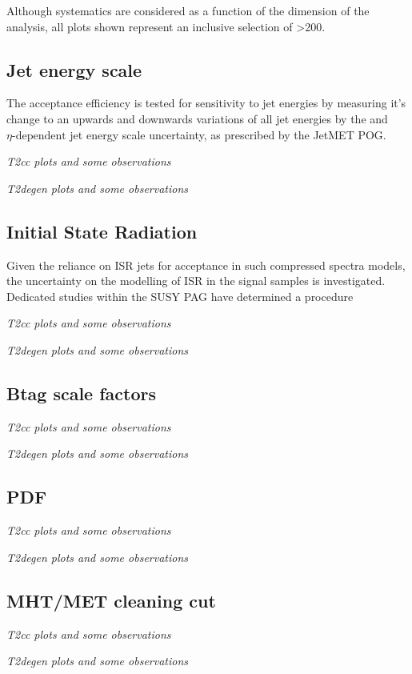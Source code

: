 Although systematics are considered as a function of the \HT dimension of the 
analysis, all plots shown represent an inclusive selection of \HT>200\gev.

\subsection{Jet energy scale}
The acceptance efficiency is tested for sensitivity to jet energies by measuring
it's change to an upwards and downwards variations of all jet energies by the 
\Pt and $\eta\text{-dependent}$ jet energy scale uncertainty, as prescribed by 
the JetMET POG.

\emph{T2cc plots and some observations}

\emph{T2degen plots and some observations}

\subsection{Initial State Radiation}
Given the reliance on ISR jets for acceptance in such compressed spectra models,
the uncertainty on the modelling of ISR in the signal samples is investigated. 
Dedicated studies within the SUSY PAG have determined a procedure


\emph{T2cc plots and some observations}

\emph{T2degen plots and some observations}

\subsection{Btag scale factors}


\emph{T2cc plots and some observations}

\emph{T2degen plots and some observations}

\subsection{PDF}

\emph{T2cc plots and some observations}

\emph{T2degen plots and some observations}

\subsection{MHT/MET cleaning cut}

\emph{T2cc plots and some observations}

\emph{T2degen plots and some observations}


